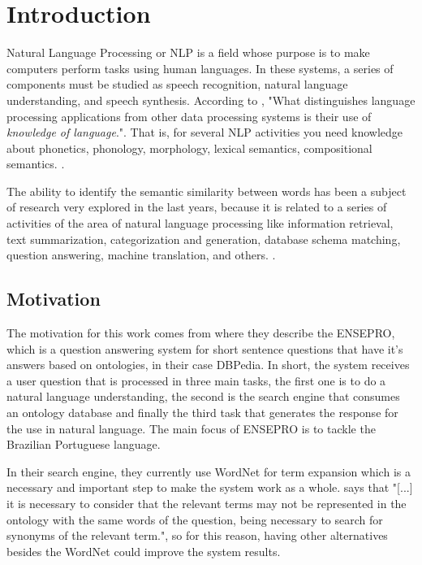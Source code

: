 \section{Introduction}\label{chap:intro}

Natural Language Processing or NLP is a field whose purpose is to make computers perform tasks using human languages. In these systems, a series of components must be studied as speech recognition, natural language understanding, and speech synthesis. According to , "What distinguishes language processing applications from other data processing systems is their use of \textit{knowledge of language}.". That is, for several NLP activities you need knowledge about phonetics, phonology, morphology, lexical semantics, compositional semantics. \cite{Jurafsky:2009:SLP:1214993}.

The ability to identify the semantic similarity between words has been a subject of research very explored in the last years, because it is related to a series of activities of the area of natural language processing like information retrieval, text summarization, categorization and generation, database schema matching, question answering, machine translation, and others. \cite{Islam2007ApplicationsOC, Jurafsky:2009:SLP:1214993}. 

\subsection{Motivation} 

The motivation for this work comes from  where they describe the ENSEPRO, which is a question answering system for short sentence questions that have it's answers based on ontologies, in their case DBPedia. In short, the system receives a user question that is processed in three main tasks, the first one is to do a natural language understanding, the second is the search engine that consumes an ontology database and finally the third task that generates the response for the use in natural language. The main focus of ENSEPRO is to tackle the Brazilian Portuguese language. 

In their search engine, they currently use WordNet for term expansion which is a necessary and important step to make the system work as a whole.  says that 
"[...] it is necessary to consider that the relevant terms may not be represented in the ontology with the same words of the question, being necessary to search for synonyms of the relevant term.", 
so for this reason, having other alternatives besides the WordNet could improve the system results.

